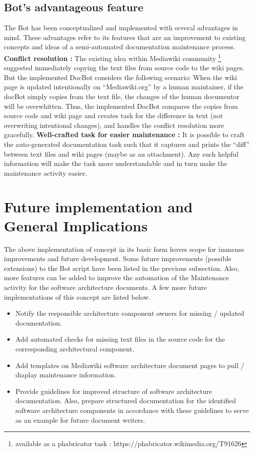 \subsection{Bot's advantageous feature}
The Bot has been conceptualized and implemented with several advantages in mind. These advantages refer to its features that are an improvement to existing concepts and ideas of a semi-automated documentation maintenance process.
\newline
\textbf{Conflict resolution : } The existing idea within Mediawiki community \footnote{available as a phabricator task :  https://phabricator.wikimedia.org/T91626} suggested immediately copying the text files from source code to the wiki pages. But the implemented DocBot considers the following scenario:
\newline When the wiki page is updated intentionally on \enquote{Mediawiki.org} by a human maintainer, if the docBot simply copies from the text file, the changes of the human documentor will be overwhitten.
\newline Thus, the implemented DocBot compares the copies from source code and wiki page and creates task for the difference in text (not overwriting intentional changes), and handles the conflict resolution more gracefully.   
\newline 
\textbf{Well-crafted task for easier maintenance : } It is possible to craft the auto-generated documentation task such that it captures and prints the \enquote{diff} between text files and wiki pages (maybe as an attachment).  Any such helpful information will make the task more understandable and in turn make the maintenance activity easier.


\section{Future implementation and General Implications }
The above implementation of concept in its basic form leaves scope for immense improvements and future development. Some future improvements (possible extensions) to the Bot script have been listed in the previous subsection. Also, more features can be added to improve the automation of the Maintenance activity for the software architecture documents.
\newline A few more future implementations of this concept are listed below.
\begin{itemize}
\item Notify the responsible architecture component owners for missing / updated documentation.
\item Add automated checks for missing text files in the source code for the corresponding architectural component. 
\item Add templates on Mediawiki software architecture document pages to pull / diaplay maintenance information.
\item Provide guidelines for improved structure of software architecture documentation.
Also, prepare structured documentation for the identified software architecture components in accordance with these guidelines to serve as an example for future document writers.
\end{itemize}

